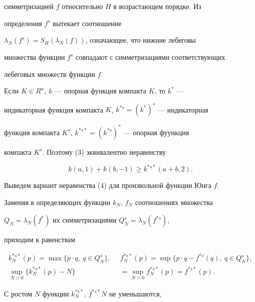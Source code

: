 симметризацией $f$ относительно $H$ в возрастающем порядке. Из 


определения $f^s$ вытекает соотношение 


$\lambda_N(f^s)=S_H(\lambda_N(f))$, означающее, что нижние лебеговы 


множества функции $f^s$ совпадают с симметризациями соответствующих 


лебеговых множеств функции $f$. 


 


Если $K\in R^n$, $k$ --- опорная функция компакта $K$, то $k^*$ --- 


индикаторная функция компакта $K$, $k^{*s}=(k^*)^s$ --- индикаторная 


функция компакта $K^s$, $k^{*s*}=(k^{*s})^*$ --- опорная фуункция 


компакта $K^s$. Поэтому (3) эквивалентно неравенству 


\begin{equation} 


k(a,1)+k(b,-1)\ge k^{*s*}(a+b,2). 


\end{equation} 


 


Выведем вариант неравенства (4) для произвольной функции Юнга $f$. 


Заменяя в определяющих функции $k_N$, $f_N$ соотношениях множества 


$Q_N=\lambda_N(f^*)$ их симметризациями $Q^s_N=\lambda_N(f^{*s})$, 


приходим к равенствам 


\begin{equation} 


\begin{split} 


k^{*s*}_N(p)=\max\{p\cdot q,\ q\in Q^s_N\},\ \; 


&f^{*s*}_N(p)=\sup\{p\cdot q-f^{*s}(q),\ q\in Q^s_N\},\\


\sup_{N>0}\{k^{*s*}_N(p)-N\}&=\sup_{N>0}f^{*s*}_N(p)= 


f^{*s*}(p).


\end{split} 


\end{equation} 


С ростом $N$ функции $k^{*s*}_N$, $f^{*s*}N$ не уменьшаются, 


